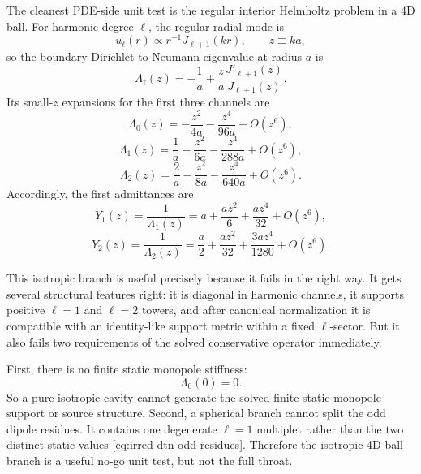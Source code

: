 \documentclass[11pt]{article}
\begin{document}
The cleanest PDE-side unit test is the regular interior Helmholtz problem in a 4D ball.
For harmonic degree \(\ell\), the regular radial mode is
\begin{equation}
u_{\ell}(r)\propto r^{-1}J_{\ell+1}(kr),
\qquad
z\equiv ka,
\label{eq:irred-dtn-ball-radial}
\end{equation}
so the boundary Dirichlet-to-Neumann eigenvalue at radius \(a\) is
\begin{equation}
\Lambda_{\ell}(z)
=
-\frac1a
+\frac{z}{a}\frac{J'_{\ell+1}(z)}{J_{\ell+1}(z)}.
\label{eq:irred-dtn-ball-Lambda}
\end{equation}
Its small-\(z\) expansions for the first three channels are
\begin{equation}
\Lambda_0(z)
=-\frac{z^2}{4a}-\frac{z^4}{96a}+O(z^6),
\label{eq:irred-dtn-ball-Lambda0}
\end{equation}
\begin{equation}
\Lambda_1(z)
=\frac1a-\frac{z^2}{6a}-\frac{z^4}{288a}+O(z^6),
\label{eq:irred-dtn-ball-Lambda1}
\end{equation}
\begin{equation}
\Lambda_2(z)
=\frac2a-\frac{z^2}{8a}-\frac{z^4}{640a}+O(z^6).
\label{eq:irred-dtn-ball-Lambda2}
\end{equation}
Accordingly, the first admittances are
\begin{equation}
Y_1(z)=\frac1{\Lambda_1(z)}=a+\frac{az^2}{6}+\frac{az^4}{32}+O(z^6),
\label{eq:irred-dtn-ball-Y1}
\end{equation}
\begin{equation}
Y_2(z)=\frac1{\Lambda_2(z)}=\frac a2+\frac{az^2}{32}+\frac{3az^4}{1280}+O(z^6).
\label{eq:irred-dtn-ball-Y2}
\end{equation}

This isotropic branch is useful precisely because it fails in the right way.
It gets several structural features right: it is diagonal in harmonic channels, it
supports positive \(\ell=1\) and \(\ell=2\) towers, and after canonical normalization it is
compatible with an identity-like support metric within a fixed \(\ell\)-sector.  But it
also fails two requirements of the solved conservative operator immediately.

First, there is no finite static monopole stiffness:
\begin{equation}
\Lambda_0(0)=0.
\label{eq:irred-dtn-ball-no-monopole}
\end{equation}
So a pure isotropic cavity cannot generate the solved finite static monopole support or
source structure.  Second, a spherical branch cannot split the odd dipole residues.  It
contains one degenerate \(\ell=1\) multiplet rather than the two distinct static values
\cref{eq:irred-dtn-odd-residues}.  Therefore the isotropic 4D-ball branch is a useful
no-go unit test, but not the full throat.
\end{document}
